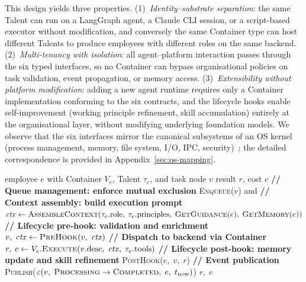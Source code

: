 \documentclass[11pt,a4paper]{article}
\begin{document}
This design yields three properties.  (1)~\emph{Identity--substrate separation}: the same Talent can run on a LangGraph agent, a Claude CLI session, or a script-based executor without modification, and conversely the same Container type can host different Talents to produce employees with different roles on the same backend.  (2)~\emph{Multi-tenancy with isolation}: all agent--platform interaction passes through the six typed interfaces, so no Container can bypass organisational policies on task validation, event propagation, or memory access.  (3)~\emph{Extensibility without platform modification}: adding a new agent runtime requires only a Container implementation conforming to the six contracts, and the lifecycle hooks enable self-improvement (working principle refinement, skill accumulation) entirely at the organisational layer, without modifying underlying foundation models.  We observe that the six interfaces mirror the canonical subsystems of an OS kernel (process management, memory, file system, I/O, IPC, security)~\cite{tanenbaum2014modern, silberschatz2018os}; the detailed correspondence is provided in Appendix~\ref{sec:os-mapping}.


\begin{algorithm}[t]
\caption{Talent Assembly.}
\label{alg:harness}
\begin{algorithmic}[1]
\Require employee $e$ with Container $V_e$, Talent $\tau_e$, and task node $v$
\Ensure result $r$, cost $c$
\State \textbf{// Queue management: enforce mutual exclusion}
    \State \textsc{Enqueue}($v$) and \Return
\EndIf
\State \textbf{// Context assembly: build execution prompt}
\State $\mathit{ctx} \gets \textsc{AssembleContext}(\tau_e.\mathrm{role},\; \tau_e.\mathrm{principles},\; \textsc{GetGuidance}(e),\; \textsc{GetMemory}(e))$
\State \textbf{// Lifecycle pre-hook: validation and enrichment}
\State $v,\; \mathit{ctx} \gets \textsc{PreHook}(v,\; \mathit{ctx})$ 
\State \textbf{// Dispatch to backend via Container}
\State $r,\; c \gets V_e.\textsc{Execute}(v.\mathrm{desc},\; \mathit{ctx},\; \tau_e.\mathrm{tools})$
\State \textbf{// Lifecycle post-hook: memory update and skill refinement}
\State \textsc{PostHook}($e,\; v,\; r$) 
\State \textbf{// Event publication}
\State \textsc{Publish}($\varepsilon(v,\; \textsc{Processing} \to \textsc{Completed},\; e,\; t_{\mathrm{now}})$)
\State \Return $r,\; c$
\end{algorithmic}
\end{algorithm}
\end{document}

